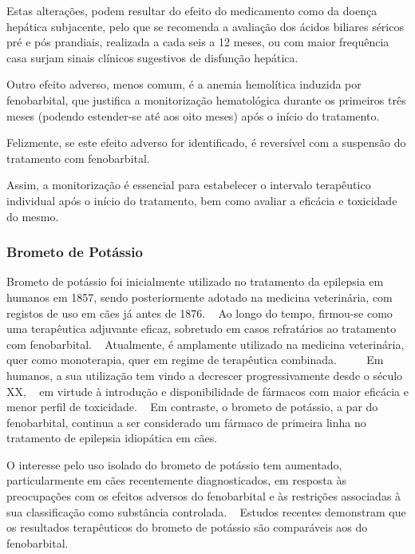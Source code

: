 Estas alterações, podem resultar do efeito do medicamento como da doença hepática subjacente, pelo que se recomenda a avaliação dos ácidos biliares séricos pré e pós prandiais, realizada a cada seis a 12 meses, ou com maior frequência casa surjam sinais clínicos sugestivos de disfunção hepática. ~\cite{Chandler2011}


Outro efeito adverso, menos comum, é a anemia hemolítica induzida por fenobarbital, que justifica a monitorização hematológica durante os primeiros três meses (podendo estender-se até aos oito meses) após o início do tratamento. ~\cite{Bersan2014} 

Felizmente, se este efeito adverso for identificado, é reversível com a suspensão do tratamento com fenobarbital. ~\cite{Bersan2014}


Assim, a monitorização é essencial para estabelecer o intervalo terapêutico individual após o início do tratamento, bem como avaliar a eficácia e toxicidade do mesmo.~\cite{Walton-Clark2022}


\subsubsection{Brometo de Potássio}


Brometo de potássio foi inicialmente utilizado no tratamento da epilepsia em humanos em 1857, sendo posteriormente adotado na medicina veterinária, com registos de uso em cães já antes de 1876. ~\cite{baird-heinz_systematic_2012} Ao longo do tempo, firmou-se como uma terapêutica adjuvante eficaz, sobretudo em casos refratários ao tratamento com fenobarbital.  ~\cite{Lichtenauer2022} Atualmente, é amplamente utilizado na medicina veterinária, quer como monoterapia, quer em regime de terapêutica combinada. ~\cite{Lichtenauer2022}~\cite{Fantinati2021}~\cite{Gouveia2024}~\cite{vol16} Em humanos, a sua utilização tem vindo a decrescer progressivamente desde o século XX, ~\cite{Lichtenauer2022} em virtude à introdução e disponibilidade de fármacos com maior eficácia e menor perfil de toxicidade. ~\cite{Lichtenauer2022} Em contraste, o brometo de potássio, a par do fenobarbital, continua a ser considerado um fármaco de primeira linha no tratamento de epilepsia idiopática em cães. ~\cite{baird-heinz_systematic_2012} 


O interesse pelo uso isolado do brometo de potássio tem aumentado, particularmente em cães recentemente diagnosticados, em resposta às preocupações com os efeitos adversos do fenobarbital e às restrições associadas à sua classificação como substância controlada. ~\cite{baird-heinz_systematic_2012} Estudos recentes demonstram que os resultados terapêuticos do brometo de potássio são comparáveis aos do fenobarbital. ~\cite{Lichtenauer2022} 


